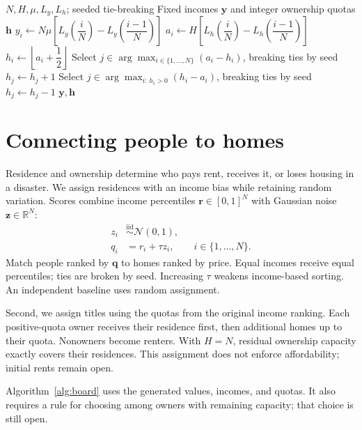 \documentclass[11pt]{article}
\begin{document}
\begin{algorithm}[H]
\caption{Assign fixed incomes and whole-home counts}
\label{alg:incomes}
\begin{algorithmic}[1]
\Require $N,H,\mu,L_y,L_h$; seeded tie-breaking
\Ensure Fixed incomes $\mathbf{y}$ and integer ownership quotas $\mathbf{h}$
    \State $y_i\gets N\mu\left[L_y\left(\dfrac{i}{N}\right)-L_y\left(\dfrac{i-1}{N}\right)\right]$
    \State $a_i\gets H\left[L_h\left(\dfrac{i}{N}\right)-L_h\left(\dfrac{i-1}{N}\right)\right]$
    \State $h_i\gets\left\lfloor a_i+\dfrac{1}{2}\right\rfloor$
\EndFor
{}
        \State Select $j\in\arg\max_{i\in\{1,\ldots,N\}}(a_i-h_i)$, breaking ties by seed
        \State $h_j\gets h_j+1$
    \Else
        \State Select $j\in\arg\max_{i:\,h_i>0}(h_i-a_i)$, breaking ties by seed
        \State $h_j\gets h_j-1$
    \EndIf
\EndWhile
\State \Return $\mathbf{y},\mathbf{h}$
\end{algorithmic}
\end{algorithm}

\section{Connecting people to homes}
Residence and ownership determine who pays rent, receives it, or loses housing in a disaster. We assign residences with an income bias while retaining random variation. Scores combine income percentiles $\mathbf{r}\in[0,1]^N$ with Gaussian noise $\mathbf{z}\in\mathbb{R}^N$:
\begin{align}
 z_i&\overset{\mathrm{iid}}{\sim}\mathcal{N}(0,1),\\[4pt]
 q_i&=r_i+\tau z_i,\qquad i\in\{1,\ldots,N\}.
\end{align}
Match people ranked by $\mathbf{q}$ to homes ranked by price. Equal incomes receive equal percentiles; ties are broken by seed. Increasing $\tau$ weakens income-based sorting. An independent baseline uses random assignment.

Second, we assign titles using the quotas from the original income ranking. Each positive-quota owner receives their residence first, then additional homes up to their quota. Nonowners become renters. With $H=N$, residual ownership capacity exactly covers their residences. This assignment does not enforce affordability; initial rents remain open.

Algorithm~\ref{alg:board} uses the generated values, incomes, and quotas. It also requires a rule for choosing among owners with remaining capacity; that choice is still open.
\end{document}
